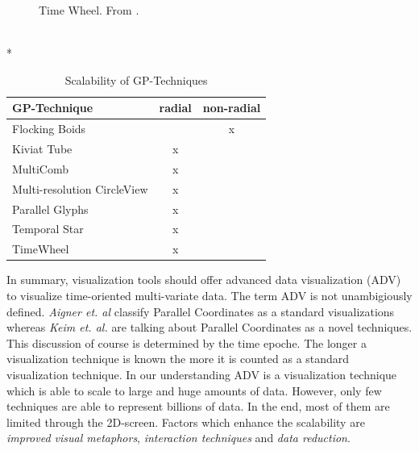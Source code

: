 \begin{figure}[H]
    \centering
    \caption{Time Wheel. From \cite{Aigner2011}.}
    \label{fig:timewheel}
\end{figure}
\\*

\begin{table}[H]
	\centering
	\caption[Table 1]{Scalability of GP-Techniques}
	\label{GPscalability}
	\begin{tabu}{lcc}
	\toprule
	GP-Technique & radial & non-radial \\
	\midrule
	Flocking Boids &  & x \\
	Kiviat Tube & x &  \\
	MultiComb & x &  \\
	Multi-resolution CircleView & x &  \\
	Parallel Glyphs & x &  \\
    Temporal Star & x &  \\
	TimeWheel & x & \\
	\bottomrule
	\end{tabu}
\end{table}


In summary, visualization tools should offer advanced data visualization (ADV) to visualize time-oriented multi-variate data. The term ADV is not unambigiously defined. \textit{Aigner et. al} classify Parallel Coordinates as a standard visualizations\cite{Aigner2011} whereas \textit{Keim et. al.} \cite{Keim} are talking about Parallel Coordinates as a novel techniques. This discussion of course is determined by the time epoche. The longer a visualization technique is known the more it is counted as a standard visualization technique. In our understanding ADV is a visualization technique which is able to scale to large and huge amounts of data.
However, only few techniques are able to represent billions of data. In the end, most of them are limited through the 2D-screen. Factors which enhance the scalability are \textit{improved visual metaphors}, \textit{interaction techniques} and \textit{data reduction}.


